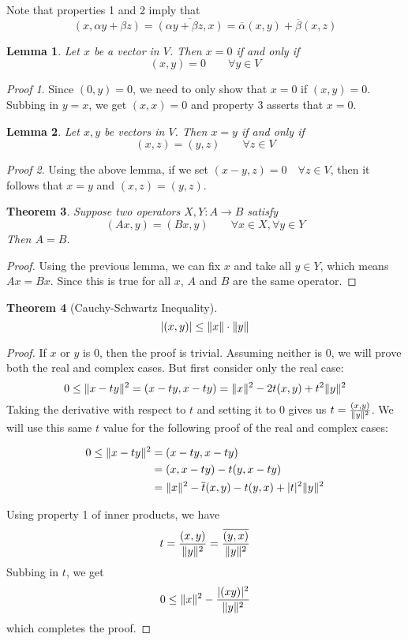 \documentclass[a4paper,10pt]{book}
\DeclarePairedDelimiter\abs{\lvert}{\rvert}
\DeclarePairedDelimiter{\norm}{\lVert}{\rVert}
\theoremstyle{plain}
\newtheorem{theorem}{Theorem}[section]
\theoremstyle{plain}
\newtheorem{lemma}[theorem]{Lemma}
\theoremstyle{remark}
\newtheorem*{lproof}{Proof}
\theoremstyle{definition}
\begin{document}
Note that properties 1 and 2 imply that 
$$(x, \alpha y + \beta z) = \overline{(\alpha y + \beta z, x)} = \overline{\alpha} (x, y) + \overline{\beta} (x, z)$$

\begin{lemma}
Let $x$ be a vector in $V$. Then $x = 0$ if and only if  
$$(x, y) = 0 \qquad \forall y \in V$$
\end{lemma}

\begin{lproof}
Since $(0, y) = 0$, we need to only show that $x = 0$ if $(x, y) = 0$. Subbing in $y = x$, we get $(x, x) = 0$ and property 3 asserts that $x = 0$. 
\end{lproof}

\begin{lemma}
Let $x, y$ be vectors in $V$. Then $x = y$ if and only if  
$$(x, z) = (y, z) \qquad \forall z \in V$$
\end{lemma}

\begin{lproof}
Using the above lemma, if we set $(x - y, z) = 0 \quad \forall z \in V$, then it follows that $x = y$ and $(x, z) = (y, z)$. 

\end{lproof}

\begin{theorem}
Suppose two operators $X, Y : A \rightarrow B$ satisfy 
$$(Ax, y) = (Bx, y) \qquad \forall x \in X, \forall y \in Y$$
Then $A = B$. 
\end{theorem}

\begin{proof}
Using the previous lemma, we can fix $x$ and take all $y \in Y$, which means $Ax = Bx$. Since this is true for all $x$, $A$ and $B$ are the same operator. 
\end{proof}

\begin{theorem}[Cauchy-Schwartz Inequality]
$$\abs{(x, y)} \leq \norm{x} \cdot \norm{y}$$
\end{theorem}

\begin{proof}
If $x$ or $y$ is 0, then the proof is trivial. Assuming neither is 0, we will prove both the real and complex cases. But first consider only the real case: 
$$0 \leq \norm{x - ty}^{2} = (x - ty, x - ty) = \norm{x}^{2} - 2t(x, y) + t^{2} \norm{y}^{2} $$
Taking the derivative with respect to $t$ and setting it to 0 gives us $t = \frac{(x, y)}{\norm{y}^{2}}$. We will use this same $t$ value for the following proof of the real and complex cases:

$$
\begin{aligned}
0 \leq \norm{x-ty}^{2} &= (x - ty, x - ty) \\ 
&= (x, x - ty) -t(y, x - ty) \\
&= \norm{x}^{2} - \overline{t} (x, y) -t (y, x) + \abs{t}^{2} \norm{y}^{2}
\end{aligned}
$$

Using property 1 of inner products, we have 
$$t = \frac{(x, y)}{\norm{y}^{2}} = \frac{\overline{(y, x)}}{\norm{y}^{2}}$$
Subbing in $t$, we get 
$$ 0 \leq \norm{x}^{2} - \frac{\abs{(x y)}^{2}}{\norm{y}^{2}}$$
which completes the proof. 
\end{proof}
\end{document}
